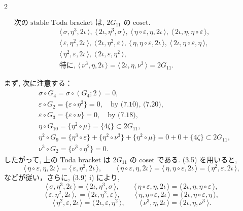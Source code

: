 \documentclass[10pt, leqno]{ltjsarticle}
\newcommand{\todas}[1]{\langle\,#1\,\rangle}
\numberwithin{equation}{section}
\theoremstyle{plain}
\theoremstyle{definition}
\theoremstyle{remark}
\begin{document}
\begin{paracol}{2}

\begin{equation}
\text{次の stable Toda bracket は, } 2G_{11} \text{ の coset.}
\qquad\qquad\qquad\qquad\qquad\qquad\qquad
\end{equation}
\[
\begin{aligned}
& \todas{\sigma,\eta^3,2\iota},\ 
\todas{2\iota,\eta^3,\sigma},\
\todas{\eta\circ\varepsilon,\eta,2\iota},\
\todas{2\iota,\eta,\eta\circ\varepsilon},\\
& \todas{\varepsilon,\eta^2,2\iota},\
\todas{2\iota,\eta^2,\varepsilon},\
\todas{\eta,\eta\circ\varepsilon,2\iota},\
\todas{2\iota,\eta\circ\varepsilon,\eta},\\
& \todas{\eta^2,\varepsilon,2\iota},\
\todas{2\iota,\varepsilon,\eta^2},\\
& \text{特に, } \todas{\nu^3,\eta,2\iota}=\todas{2\iota,\eta,\nu^3}=2G_{11}.
\end{aligned}
\]

\medskip
\noindent まず, 次に注意する：
\[
\begin{aligned}
&\sigma\circ G_4=\sigma\circ(G_4;2)=0,\\
&\varepsilon\circ G_2=\{\varepsilon\circ\eta^2\}=0,
\quad\text{by (7.10), (7.20)},\\
&\varepsilon\circ G_3=\{\varepsilon\circ\nu\}=0,
\quad\text{by (7.18)},\\
&\eta\circ G_{10}=\{\eta^2\circ\mu\}=\{4\zeta\}\subset 2G_{11},\\
&\eta^2\circ G_{9}
=\{\eta^3\circ\varepsilon\}+\{\eta^2\circ\nu^3\}+\{\eta^2\circ\mu\}
=0+0+\{4\zeta\}\subset 2G_{11},\\
&\nu^3\circ G_{2} = \{\nu^3\circ\eta^2\}=0.
\end{aligned}
\]
したがって, 上の Toda bracket は \(2G_{11}\) の coset である. 
(3.5) を用いると, 
\[
\todas{\eta\circ\varepsilon,\eta,2\iota}
=\todas{\varepsilon,\eta^2,2\iota},\qquad
\todas{\eta\circ\varepsilon,\eta,2\iota}
=\todas{\eta,\eta\circ\varepsilon,2\iota}
=\todas{\eta^2,\varepsilon,2\iota},
\]
などが従い，さらに,  (3.9) i) により, 
\[
\todas{\sigma,\eta^3,2\iota}
=\todas{2\iota,\eta^3,\sigma},\qquad
\todas{\eta\circ\varepsilon, \eta, 2\iota}
= \todas{2\iota, \eta, \eta\circ\varepsilon},
\]
\[
\todas{\varepsilon, \eta^2, 2\iota},
= \todas{2\iota, \eta^2, \varepsilon},\qquad
\todas{\eta, \eta\circ\varepsilon, 2\iota}
= \todas{2\iota, \eta\circ\varepsilon, \eta},
\]
\[
\todas{\eta^2, \varepsilon, 2\iota}
= \todas{2\iota, \varepsilon, \eta^2},\qquad
\todas{\nu^3,\eta,2\iota}
=\todas{2\iota,\eta,\nu^3}.
\]


\end{paracol}
\end{document}
